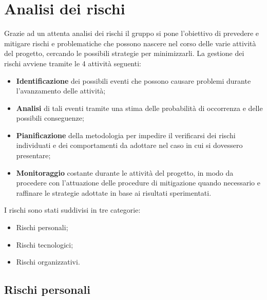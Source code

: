 \section{Analisi dei rischi}

Grazie ad un attenta analisi dei rischi il gruppo si pone l'obiettivo di prevedere e mitigare rischi e problematiche che possono nascere nel corso delle varie attività del progetto, cercando le possibili strategie per minimizzarli. 
La gestione dei rischi avviene tramite le 4 attività seguenti:
\begin{itemize}
	\item \textbf{Identificazione} dei possibili eventi che possono causare problemi durante l'avanzamento delle attività;
	\item \textbf{Analisi} di tali eventi tramite una stima delle probabilità di occorrenza e delle possibili conseguenze;
	\item \textbf{Pianificazione} della metodologia per impedire il verificarsi dei rischi individuati e dei comportamenti da adottare nel caso in cui si dovessero presentare;
	\item \textbf{Monitoraggio} costante durante le attività del progetto, in modo da procedere con l'attuazione delle procedure di mitigazione quando necessario e raffinare le strategie adottate in base ai risultati sperimentati.
\end{itemize}

I rischi sono stati suddivisi in tre categorie:
\begin{itemize}
	\item Rischi personali;
	\item Rischi tecnologici;
	\item Rischi organizzativi.
\end{itemize}

\newpage
\subsection{Rischi personali}

